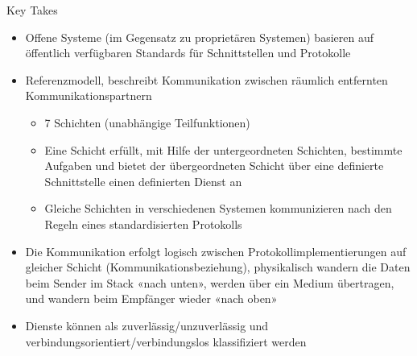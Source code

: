 \begin{KR}{Key Takes}
    \begin{itemize}
        \item Offene Systeme (im Gegensatz zu proprietären Systemen) basieren auf öffentlich verfügbaren Standards für Schnittstellen und Protokolle
        \item Referenzmodell, beschreibt Kommunikation zwischen räumlich entfernten Kommunikationspartnern
        \begin{itemize}
            \item 7 Schichten (unabhängige Teilfunktionen)
            \item Eine Schicht erfüllt, mit Hilfe der untergeordneten Schichten, bestimmte Aufgaben und bietet der übergeordneten Schicht über eine definierte Schnittstelle einen definierten Dienst an
            \item Gleiche Schichten in verschiedenen Systemen kommunizieren nach den Regeln eines standardisierten Protokolls
        \end{itemize}
        \item Die Kommunikation erfolgt logisch zwischen Protokollimplementierungen auf gleicher Schicht (Kommunikationsbeziehung), physikalisch wandern die Daten beim Sender im Stack «nach unten», werden über ein Medium übertragen, und wandern beim Empfänger wieder «nach oben»
        \item Dienste können als zuverlässig/unzuverlässig und verbindungsorientiert/verbindungslos klassifiziert werden
    \end{itemize}
    
\end{KR}


 
    
 